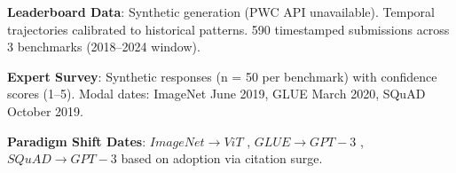 
\textbf{Leaderboard Data}: Synthetic generation (PWC API unavailable). Temporal trajectories calibrated to historical patterns. 590 timestamped submissions across 3 benchmarks (2018--2024 window).

\textbf{Expert Survey}: Synthetic responses (n = 50 per benchmark) with confidence scores (1--5). Modal dates: ImageNet June 2019, GLUE March 2020, SQuAD October 2019.

\textbf{Paradigm Shift Dates}: $ImageNet\rightarrow ViT$ \citep{February2022}, $GLUE\rightarrow GPT-3$ \citep{January2021}, $SQuAD\rightarrow GPT-3$ \citep{January2021} based on adoption via citation surge.
